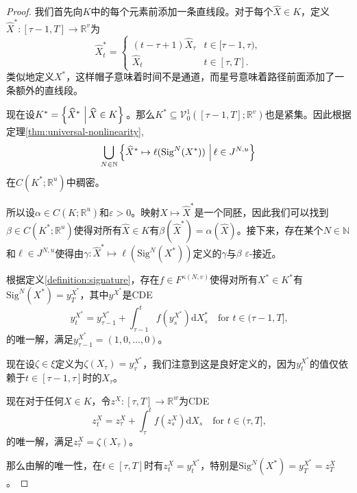 \documentclass{ctexart}
\theoremstyle{plain}
\theoremstyle{definition}
\newcommand{\reals}{\mathbb{R}}
\newcommand{\naturals}{\mathbb{N}}
\newcommand{\set}[2]{\left\{{#1}\,\left\vert\,{#2}\vphantom{{#1}}\right\}\right.}
\begin{document}
\begin{proof}
我们首先向$K$中的每个元素前添加一条直线段。对于每个$\widehat{X} \in K$，定义$\widehat{X}^* \colon [\tau-1, T] \to \reals^v$为
\begin{equation*}
	\widehat{X}^*_t =
\begin{cases}
	(t-\tau + 1)\widehat{X}_\tau & t \in [\tau-1 , \tau),\\
	\widehat{X}_t & t \in [\tau, T].
\end{cases}
\end{equation*}
类似地定义$X^*$，这样帽子意味着时间不是通道，而星号意味着路径前面添加了一条额外的直线段。

现在设$K^* = \set{\widehat{X}^*}{\widehat{X} \in K}$。那么$K^* \subseteq \mathcal{V}^1_0([\tau-1, T]; \reals^v)$也是紧集。因此根据定理\ref{thm:universal-nonlinearity},
\begin{equation*}
	\bigcup_{N \in \naturals} \set{\widehat{X}^* \mapsto \ell(\mathrm{Sig}^N(X^*))}{\ell \in J^{N, u}}
\end{equation*}
在$C(K^*; \reals^u)$中稠密。

所以设$\alpha \in C(K; \reals^u)$和$\varepsilon > 0$。映射$\widehat{X} \mapsto \widehat{X}^*$是一个同胚，因此我们可以找到$\beta \in C(K^*; \reals^u)$使得对所有$\widehat{X} \in K$有$\beta(\widehat{X}^*) = \alpha(\widehat{X})$。接下来，存在某个$N \in \naturals$和$\ell \in J^{N, u}$使得由$\gamma \colon \widehat{X}^* \mapsto \ell(\mathrm{Sig}^N(X^*))$定义的$\gamma$与$\beta$ $\varepsilon$-接近。

根据定义\ref{definition:signature}，存在$f \in F^{\kappa(N, v)}$使得对所有$X^* \in K^*$有$\mathrm{Sig}^N(X^*) = y^{X^*}_T$，其中$y^{X^*}$是CDE
\begin{equation*}
	y^{X^*}_t = y^{X^*}_{\tau-1} + \int_{\tau-1}^t f(y^{X^*}_s) \mathrm{d}X^*_s\quad\text{for $t \in (\tau-1, T]$,}
\end{equation*}
的唯一解，满足$y^{X^*}_{\tau-1} = (1, 0, \ldots, 0)$。

现在设$\zeta \in \xi$定义为$\zeta(X_\tau) = y^{X^*}_\tau$，我们注意到这是良好定义的，因为$y^{X^*}_t$的值仅依赖于$t \in [\tau-1, \tau]$时的$X_\tau$。

现在对于任何$X \in K$，令$z^{X} \colon [\tau, T] \to \reals^w$为CDE
\begin{equation*}
	z^{X}_t = z^{X}_\tau + \int_\tau^t f(z^{X}_s) \mathrm{d}X_s\quad\text{for $t \in (\tau, T]$,}
\end{equation*}
的唯一解，满足$z^{X}_\tau = \zeta(X_\tau)$。

那么由解的唯一性，在$t \in [\tau, T]$时有$z^{X}_t = y^{X^*}_t$，特别是$\mathrm{Sig}^N(X^*) = y^{X^*}_T = z^{X}_T$。


\end{proof}
\end{document}
